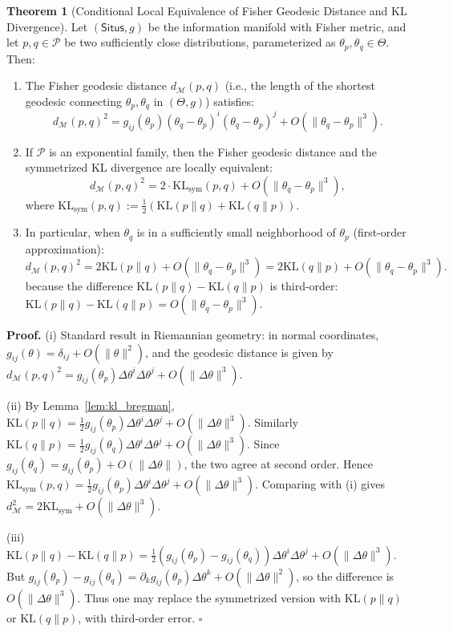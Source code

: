 \documentclass[12pt,a4paper]{article}
\theoremstyle{definition}
\newtheorem{theorem}{Theorem}[section]
\theoremstyle{remark}
\theoremstyle{definition}
\newcommand{\Situs}{\textsf{Situs}}
\newcommand{\KL}{\mathrm{KL}}
\newcommand{\GeoDist}{d_{\mathcal{M}}}
\begin{document}
\begin{theorem}[Conditional Local Equivalence of Fisher Geodesic Distance and KL Divergence]\label{thm:fisher_kl_equivalence}
Let $(\Situs, g)$ be the information manifold with Fisher metric, and let $p, q \in \mathcal{P}$ be two sufficiently close distributions,
parameterized as $\theta_p, \theta_q \in \Theta$. Then:

\begin{enumerate}[label=(\roman*)]
    \item The Fisher geodesic distance $\GeoDist(p, q)$ (i.e., the length of the shortest geodesic connecting $\theta_p, \theta_q$ in $(\Theta, g)$) satisfies:
    \[
        \GeoDist(p, q)^2 = g_{ij}(\theta_p)(\theta_q - \theta_p)^i (\theta_q - \theta_p)^j
        + O(\|\theta_q - \theta_p\|^3).
    \]

    \item If $\mathcal{P}$ is an exponential family, then the Fisher geodesic distance and the symmetrized KL divergence are locally equivalent:
    \[
        \GeoDist(p, q)^2 = 2 \cdot \KL_{\text{sym}}(p, q) + O(\|\theta_q - \theta_p\|^3),
    \]
    where $\KL_{\text{sym}}(p, q) := \frac{1}{2}(\KL(p\|q) + \KL(q\|p))$.

    \item In particular, when $\theta_q$ is in a sufficiently small neighborhood of $\theta_p$ (first-order approximation):
    \[
        \GeoDist(p, q)^2 = 2\KL(p\|q) + O(\|\theta_q - \theta_p\|^3)
        = 2\KL(q\|p) + O(\|\theta_q - \theta_p\|^3).
    \]
    because the difference $\KL(p\|q) - \KL(q\|p)$ is third-order:
    $\KL(p\|q) - \KL(q\|p) = O(\|\theta_q - \theta_p\|^3)$.
\end{enumerate}

\textbf{Proof.}
(i) Standard result in Riemannian geometry: in normal coordinates, $g_{ij}(\theta) = \delta_{ij} + O(\|\theta\|^2)$,
and the geodesic distance is given by $\GeoDist(p, q)^2 = g_{ij}(\theta_p)\Delta\theta^i \Delta\theta^j + O(\|\Delta\theta\|^3)$.

(ii) By Lemma~\ref{lem:kl_bregman}, $\KL(p\|q) = \frac{1}{2}g_{ij}(\theta_p)\Delta\theta^i\Delta\theta^j + O(\|\Delta\theta\|^3)$.
Similarly $\KL(q\|p) = \frac{1}{2}g_{ij}(\theta_q)\Delta\theta^i\Delta\theta^j + O(\|\Delta\theta\|^3)$.
Since $g_{ij}(\theta_q) = g_{ij}(\theta_p) + O(\|\Delta\theta\|)$, the two agree at second order.
Hence $\KL_{\text{sym}}(p, q) = \frac{1}{2}g_{ij}(\theta_p)\Delta\theta^i\Delta\theta^j + O(\|\Delta\theta\|^3)$.
Comparing with (i) gives $\GeoDist^2 = 2\KL_{\text{sym}} + O(\|\Delta\theta\|^3)$.

(iii) $\KL(p\|q) - \KL(q\|p) = \frac{1}{2}(g_{ij}(\theta_p) - g_{ij}(\theta_q))\Delta\theta^i\Delta\theta^j + O(\|\Delta\theta\|^3)$.
But $g_{ij}(\theta_p) - g_{ij}(\theta_q) = \partial_k g_{ij}(\theta_p) \Delta\theta^k + O(\|\Delta\theta\|^2)$,
so the difference is $O(\|\Delta\theta\|^3)$. Thus one may replace the symmetrized version with $\KL(p\|q)$ or $\KL(q\|p)$, with third-order error. $\square$
\end{theorem}
\end{document}
